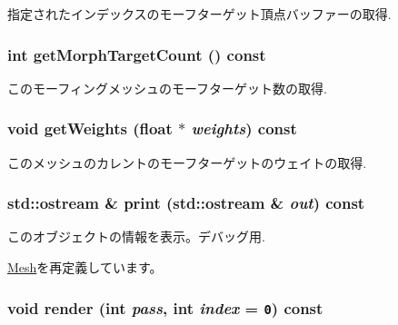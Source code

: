 指定されたインデックスのモーフターゲット頂点バッファーの取得. \hypertarget{classm3g_1_1MorphingMesh_620d9684124201f738a28c7c39641541}{
\subsubsection[{getMorphTargetCount}]{\setlength{\rightskip}{0pt plus 5cm}int getMorphTargetCount () const}}
\label{classm3g_1_1MorphingMesh_620d9684124201f738a28c7c39641541}


このモーフィングメッシュのモーフターゲット数の取得. \hypertarget{classm3g_1_1MorphingMesh_80cef3b2c5e4881567409829de224e46}{
\subsubsection[{getWeights}]{\setlength{\rightskip}{0pt plus 5cm}void getWeights (float $\ast$ {\em weights}) const}}
\label{classm3g_1_1MorphingMesh_80cef3b2c5e4881567409829de224e46}


このメッシュのカレントのモーフターゲットのウェイトの取得. \hypertarget{classm3g_1_1MorphingMesh_6fea17fa1532df3794f8cb39cb4f911f}{
\subsubsection[{print}]{\setlength{\rightskip}{0pt plus 5cm}std::ostream \& print (std::ostream \& {\em out}) const}}
\label{classm3g_1_1MorphingMesh_6fea17fa1532df3794f8cb39cb4f911f}


このオブジェクトの情報を表示。デバッグ用. 

\hyperlink{classm3g_1_1Mesh_6fea17fa1532df3794f8cb39cb4f911f}{Mesh}を再定義しています。\hypertarget{classm3g_1_1MorphingMesh_1efcb1973989d9963d5bd6d03065d389}{
\subsubsection[{render}]{\setlength{\rightskip}{0pt plus 5cm}void render (int {\em pass}, \/  int {\em index} = {\tt 0}) const}}
\label{classm3g_1_1MorphingMesh_1efcb1973989d9963d5bd6d03065d389}



